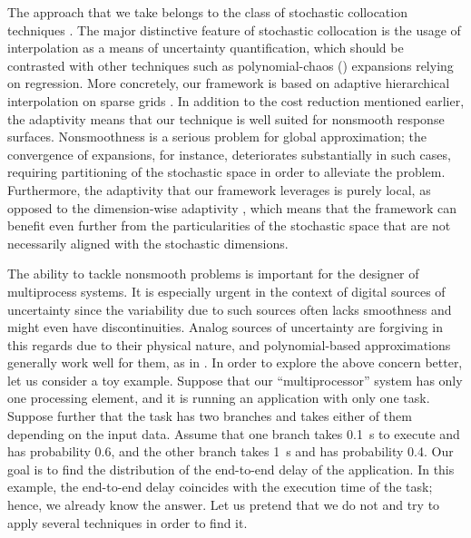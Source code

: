 The approach that we take belongs to the class of stochastic collocation
techniques \cite{xiu2010}. The major distinctive feature of stochastic
collocation is the usage of interpolation as a means of uncertainty
quantification, which should be contrasted with other techniques such as
polynomial-chaos () expansions relying on regression. More concretely,
our framework is based on adaptive hierarchical interpolation on sparse grids
\cite{klimke2006, ma2009}. In addition to the cost reduction mentioned earlier,
the adaptivity means that our technique is well suited for nonsmooth response
surfaces. Nonsmoothness is a serious problem for global approximation; the
convergence of  expansions, for instance, deteriorates substantially in
such cases, requiring partitioning of the stochastic space in order to alleviate
the problem. Furthermore, the adaptivity that our framework leverages is purely
local, as opposed to the dimension-wise adaptivity \cite{klimke2006}, which
means that the framework can benefit even further from the particularities of
the stochastic space that are not necessarily aligned with the stochastic
dimensions.


The ability to tackle nonsmooth problems is important for the designer of
multiprocess systems. It is especially urgent in the context of digital sources
of uncertainty since the variability due to such sources often lacks smoothness
and might even have discontinuities. Analog sources of uncertainty are forgiving
in this regards due to their physical nature, and polynomial-based
approximations generally work well for them, as in \cite{bhardwaj2008, lee2013,
ukhov2014, ukhov2015}. In order to explore the above concern better, let us
consider a toy example. Suppose that our ``multiprocessor'' system has only one
processing element, and it is running an application with only one task. Suppose
further that the task has two branches and takes either of them depending on the
input data. Assume that one branch takes 0.1~s to execute and has probability
0.6, and the other branch takes 1~s and has probability 0.4. Our goal is to find
the distribution of the end-to-end delay of the application. In this example,
the end-to-end delay coincides with the execution time of the task; hence, we
already know the answer. Let us pretend that we do not and try to apply several
techniques in order to find it.

